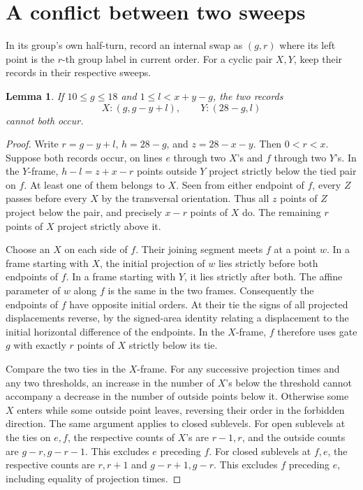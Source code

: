 \documentclass[11pt]{article}
\newtheorem{lemma}[theorem]{Lemma}
\begin{document}
\section{A conflict between two sweeps}
In its group's own half-turn, record an internal swap as \((g,r)\) where its left point is the \(r\)-th group label in current order. For a cyclic pair \(X,Y\), keep their records in their respective sweeps.
\begin{lemma}\label{lem:clash}
If \(10\le g\le18\) and \(1\le l<x+y-g\), the two records
\[
                   X:(g,g-y+l),\qquad Y:(28-g,l)                 \tag{7}
\]
cannot both occur.
\end{lemma}
\begin{proof}
Write \(r=g-y+l\), \(h=28-g\), and \(z=28-x-y\). Then \(0<r<x\). Suppose both records occur, on lines \(e\) through two \(X\)'s and \(f\) through two \(Y\)'s. In the \(Y\)-frame, \(h-l=z+x-r\) points outside \(Y\) project strictly below the tied pair on \(f\). At least one of them belongs to \(X\). Seen from either endpoint of \(f\), every \(Z\) passes before every \(X\) by the transversal orientation. Thus all \(z\) points of \(Z\) project below the pair, and precisely \(x-r\) points of \(X\) do. The remaining \(r\) points of \(X\) project strictly above it.

Choose an \(X\) on each side of \(f\). Their joining segment meets \(f\) at a point \(w\). In a frame starting with \(X\), the initial projection of \(w\) lies strictly before both endpoints of \(f\). In a frame starting with \(Y\), it lies strictly after both. The affine parameter of \(w\) along \(f\) is the same in the two frames. Consequently the endpoints of \(f\) have opposite initial orders. At their tie the signs of all projected displacements reverse, by the signed-area identity relating a displacement to the initial horizontal difference of the endpoints. In the \(X\)-frame, \(f\) therefore uses gate \(g\) with exactly \(r\) points of \(X\) strictly below its tie.

Compare the two ties in the \(X\)-frame. For any successive projection times and any two thresholds, an increase in the number of \(X\)'s below the threshold cannot accompany a decrease in the number of outside points below it. Otherwise some \(X\) enters while some outside point leaves, reversing their order in the forbidden direction. The same argument applies to closed sublevels. For open sublevels at the ties on \(e,f\), the respective counts of \(X\)'s are \(r-1,r\), and the outside counts are \(g-r,g-r-1\). This excludes \(e\) preceding \(f\). For closed sublevels at \(f,e\), the respective counts are \(r,r+1\) and \(g-r+1,g-r\). This excludes \(f\) preceding \(e\), including equality of projection times.
\end{proof}
\end{document}
